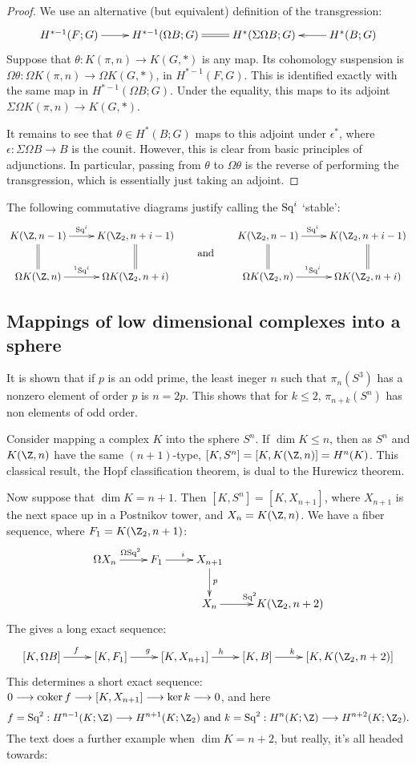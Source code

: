 \documentclass[11pt]{article}
\begin{document}
\begin{proof}
We use an alternative (but equivalent) definition of the transgression:
\[\xymatrix{
H^{*-1}(F;G)\ar[r]&
H^{*-1}(\Omega B;G)\ar@{=}[r]&
H^{*}(\Sigma\Omega B;G)&
\ar[l] H^{*}(B;G)
}\]
Suppose that $\theta:K(\pi,n)\to K(G,*)$ is any map. Its cohomology suspension
is $\Omega\theta:\Omega K(\pi,n)\to \Omega K(G,*)$, in $H^{*-1}(F,G)$. This is
identified exactly with the same map in $H^{*-1}(\Omega B;G)$. Under the
equality, this maps to its adjoint $\Sigma\Omega K(\pi,n)\to K(G,*)$.

It remains to see that $\theta\in H^*(B;G)$ maps to this adjoint under
$\epsilon^*$, where $\epsilon:\Sigma\Omega B\to B$ is the counit. However, this
is clear from basic principles of adjunctions. In particular, passing from
$\theta$ to $\Omega\theta$ is the reverse of performing the transgression, which
is essentially just taking an adjoint.
\end{proof}
The following commutative diagrams justify calling the $\textup{Sq}^i$ `stable':
\[\xymatrix{
K(\Z,n-1)\ar[r]^{\Squ^i\ \ \ }\ar@{=}[d]& K(\Z_2,n+i-1)\ar@{=}[d]\\
\Omega K(\Z,n)\ar[r]^{^1\Squ^i\ \ \ }& \Omega K(\Z_2,n+i)
}
\raisebox{-.6cm}{\qquad\text{and}\qquad}
\xymatrix{
K(\Z_2,n-1)\ar[r]^{\Squ^i\ \ \ }\ar@{=}[d]& K(\Z_2,n+i-1)\ar@{=}[d]\\
\Omega K(\Z_2,n)\ar[r]^{^1\Squ^i\ \ \ }& \Omega K(\Z_2,n+i)
}
\]
\subsection{Mappings of low dimensional complexes into a sphere}
It is shown that if $p$ is an odd prime, the least ineger $n$ such that
$\pi_n(S^3)$ has a nonzero element of order $p$ is $n=2p$. This shows that for
$k\leq2$, $\pi_{n+k}(S^n)$ has non elements of odd order.

Consider mapping a complex $K$ into the sphere $S^n$. If $\dim K\leq n$, then as
$S^n$ and $K(\Z,n)$ have the same $(n+1)$-type, $[K,S^n]=[K,K(\Z,n)]=H^n(K)$.
This classical result, the Hopf classification theorem, is dual to the Hurewicz
theorem.

Now suppose that $\dim K=n+1$. Then $[K,S^n]=[K,X_{n+1}]$, where $X_{n+1}$ is
the next space up in a Postnikov tower, and $X_n=K(\Z,n)$. We have a fiber
sequence, where $F_1=K(\Z_2,n+1)$:
\[\xymatrix{
\Omega X_n\ar[r]^{\Omega\Squ^2}&F_1\ar[r]^i&X_{n+1}\ar[d]^p\\
&&X_n\ar[r]^{\Squ^2}&K(\Z_2,n+2)
}\]
The gives a long exact sequence:
\[\xymatrix{
[K,\Omega B]\ar[r]^f&
[K,F_1]\ar[r]^g&
[K,X_{n+1}]\ar[r]^h&
[K,B]\ar[r]^{k\qquad}&
[K,K(\Z_2,n+2)]
}\]
This determines a short exact sequence: 
$0\longrightarrow\operatorname{coker} f\longrightarrow [K,X_{n+1}]\longrightarrow\textup{ker}\, k\longrightarrow0$, and here
\[f=\Squ^2:H^{n-1}(K;\Z)\to H^{n+1}(K;\Z_2)\text{ and }
k=\Squ^2:H^{n}(K;\Z)\to H^{n+2}(K;\Z_2).\]
The text does a further example when $\dim K=n+2$, but really, it's all headed
towards:
\end{document}
